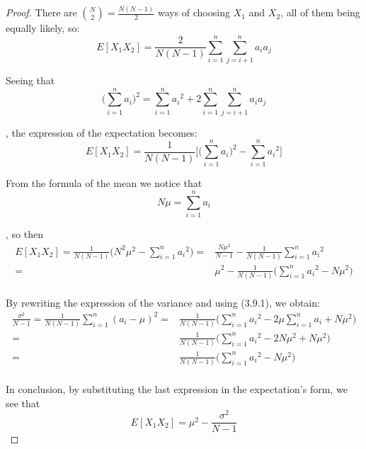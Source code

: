\begin{proof}
    There are $\binom{N}{2} = \frac{N(N - 1)}{2}$ ways of choosing $X_1$ and $X_2$, all of
    them being equally likely, so:
    \[
        E[X_1X_2] = \frac{2}{N(N - 1)} \sum_{i = 1}^n \sum_{j = i + 1}^n a_ia_j
    \] 

    Seeing that
    \[
        \bigg(\sum_{i = 1}^n a_i\bigg)^2 = \sum_{i = 1}^n {a_i}^2 + 2\sum_{i = 1}^n \sum_{j = i + 1}^n a_ia_j
    \] 

    , the expression of the expectation becomes:
    \[
        E[X_1X_2] = \frac{1}{N(N - 1)} \bigg[\bigg(\sum_{i = 1}^n a_i\bigg)^2 - \sum_{i = 1}^n {a_i}^2\bigg]
    \] 
    
    From the formula of the mean we notice that
    \begin{equation*}\tag{3.9.1}
        N\mu = \sum_{i = 1}^n a_i
    \end{equation*}

    , so then
    \begin{align*}
        E[X_1X_2] = \frac{1}{N(N - 1)} \bigg(N^2\mu^2 - \sum_{i = 1}^n {a_i}^2\bigg) 
        =& \frac{N\mu^2}{N - 1} - \frac{1}{N(N - 1)}\sum_{i = 1}^n {a_i}^2 \\
        =& \mu^2 - \frac{1}{N(N - 1)}\bigg(\sum_{i = 1}^n {a_i}^2 - N\mu^2\bigg) \\
    \end{align*}

    By rewriting the expression of the variance and using (3.9.1), we obtain:
    \begin{align*}
        \frac{\sigma^2}{N - 1} = \frac{1}{N(N - 1)}\sum_{i = 1}^n (a_i - \mu)^2
        =& \frac{1}{N(N - 1)} \bigg(\sum_{i = 1}^n {a_i}^2 - 2\mu \sum_{i = 1}^n a_i + N\mu^2\bigg) \\
        =& \frac{1}{N(N - 1)} \bigg(\sum_{i = 1}^n {a_i}^2 - 2N\mu^2 + N\mu^2\bigg) \\
        =& \frac{1}{N(N - 1)} \bigg(\sum_{i = 1}^n {a_i}^2 - N\mu^2\bigg) \\
    \end{align*}

    In conclusion, by substituting the last expression in the expectation's form, we see
    that
    \begin{equation*}\tag{3.90}
        E[X_1X_2] = \mu^2 - \frac{\sigma^2}{N - 1}
    \end{equation*}
\end{proof}

